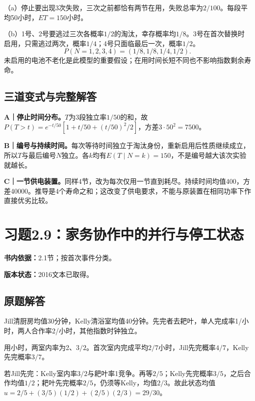\documentclass[
  11pt,
  a4paper,
  UTF8,fontset=fandol]{ctexart}
\let\OldSection\section
\renewcommand{\section}{\Needspace{7\baselineskip}\OldSection}
\let\OldSubsection\subsection
\renewcommand{\subsection}{\Needspace{5\baselineskip}\OldSubsection}
\begin{document}
（a）停止要出现3次失败，三次之前都恰有两节在用，失败总率为\(2/100\)。每段平均50小时，\(\boxed{ET=150\text{小时}}\)。

（b）1号、2号要逃过三次各概率\(1/2\)的淘汰，幸存概率均\(1/8\)。3号在首次替换时启用，只需逃过两次，概率\(1/4\)；4号只面临最后一次，概率\(1/2\)。
\[\boxed{P(N=1,2,3,4)=(1/8,1/8,1/4,1/2).}\]
未启用的电池不老化是此模型的重要假设；在用时间长短不同也不影响指数剩余寿命。

\subsection{三道变式与完整解答}\label{ux4e09ux9053ux53d8ux5f0fux4e0eux5b8cux6574ux89e3ux7b54-7}

\textbf{A｜停止时间分布。}\(T\)为3段独立率\(1/50\)的和，故\(P(T>t)=e^{-t/50}[1+t/50+(t/50)^2/2]\)，方差\(3\cdot50^2=7500\)。

\textbf{B｜编号与持续时间。}每次等待时间独立于淘汰身份，重新启用后性质继续成立，所以\(T\)与最后编号\(N\)独立。各\(k\)均有\(E(T\mid N=k)=150\)，不是编号越大该次实验就越长。

\textbf{C｜一节供电装置。}同样4节，改为每次仅用一节直到耗尽。持续时间均值400，方差40000。推导是4个寿命之和；这改变了供电要求，不能与原装置在相同功率下作直接优劣比较。

\newpage

\section{习题2.9：家务协作中的并行与停工状态}\label{ux4e60ux98982.9ux5bb6ux52a1ux534fux4f5cux4e2dux7684ux5e76ux884cux4e0eux505cux5de5ux72b6ux6001}

\textbf{书内依据：}2.1节；按首次事件分类。

\textbf{版本状态：}2016文本已取得。

\subsection{原题解答}\label{ux539fux9898ux89e3ux7b54-8}

Jill清厨房均值30分钟，Kelly清浴室均值40分钟。先完者去耙叶，单人完成率1/小时，两人合作率2/小时，其他指数时钟独立。

用小时，两室内率为2、\(3/2\)。首次室内完成平均\(2/7\)小时，Jill先完概率\(4/7\)，Kelly先完概率\(3/7\)。

若Jill先完：Kelly室内率\(3/2\)与耙叶率1竞争。再等\(2/5\)；Kelly先完概率\(3/5\)，之后合作均值\(1/2\)；耙叶先完概率\(2/5\)，仍须等Kelly，均值\(2/3\)。故此状态均值\(u=2/5+(3/5)(1/2)+(2/5)(2/3)=29/30\)。
\end{document}
